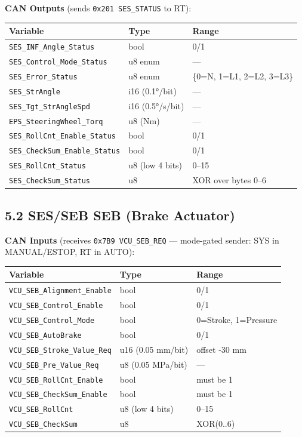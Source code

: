 \documentclass[12pt,a4paper,oneside]{report}
\begin{document}
\textbf{CAN Outputs} (sends \texttt{0x201\ SES\_STATUS} to RT):

\begin{longtable}[]{@{}lll@{}}
\toprule\noalign{}
Variable & Type & Range \\
\midrule\noalign{}
\endhead
\bottomrule\noalign{}
\endlastfoot
\texttt{SES\_INF\_Angle\_Status} & bool & 0/1 \\
\texttt{SES\_Control\_Mode\_Status} & u8 enum & --- \\
\texttt{SES\_Error\_Status} & u8 enum & \{0=N, 1=L1, 2=L2, 3=L3\} \\
\texttt{SES\_StrAngle} & i16 (0.1°/bit) & --- \\
\texttt{SES\_Tgt\_StrAngleSpd} & i16 (0.5°/s/bit) & --- \\
\texttt{EPS\_SteeringWheel\_Torq} & u8 (Nm) & --- \\
\texttt{SES\_RollCnt\_Enable\_Status} & bool & 0/1 \\
\texttt{SES\_CheckSum\_Enable\_Status} & bool & 0/1 \\
\texttt{SES\_RollCnt\_Status} & u8 (low 4 bits) & 0--15 \\
\texttt{SES\_CheckSum\_Status} & u8 & XOR over bytes 0--6 \\
\end{longtable}

\subsection{5.2 SES/SEB SEB (Brake Actuator)}\label{SES/SEB-seb-brake-actuator}

\textbf{CAN Inputs} (receives \texttt{0x7B9\ VCU\_SEB\_REQ} --- mode-gated
sender: SYS in MANUAL/ESTOP, RT in AUTO):

\begin{longtable}[]{@{}lll@{}}
\toprule\noalign{}
Variable & Type & Range \\
\midrule\noalign{}
\endhead
\bottomrule\noalign{}
\endlastfoot
\texttt{VCU\_SEB\_Alignment\_Enable} & bool & 0/1 \\
\texttt{VCU\_SEB\_Control\_Enable} & bool & 0/1 \\
\texttt{VCU\_SEB\_Control\_Mode} & bool & 0=Stroke, 1=Pressure \\
\texttt{VCU\_SEB\_AutoBrake} & bool & 0/1 \\
\texttt{VCU\_SEB\_Stroke\_Value\_Req} & u16 (0.05 mm/bit) & offset -30 mm \\
\texttt{VCU\_SEB\_Pre\_Value\_Req} & u8 (0.05 MPa/bit) & --- \\
\texttt{VCU\_SEB\_RollCnt\_Enable} & bool & must be 1 \\
\texttt{VCU\_SEB\_CheckSum\_Enable} & bool & must be 1 \\
\texttt{VCU\_SEB\_RollCnt} & u8 (low 4 bits) & 0--15 \\
\texttt{VCU\_SEB\_CheckSum} & u8 & XOR(0..6) \\
\end{longtable}
\end{document}
